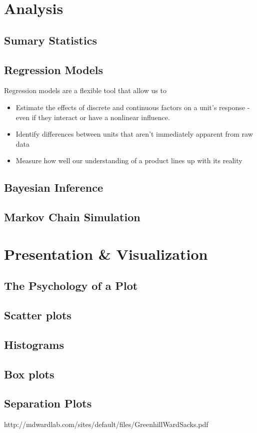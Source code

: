 \documentclass[11pt,a4paper,article]{memoir} %
\begin{document}
\section{Analysis}
\subsection{Sumary Statistics}
\subsection{Regression Models}
Regression models are a flexible tool that allow us to
\begin{itemize}
\item Estimate the effects of discrete and continuous factors on a unit's response - even if they interact or have a nonlinear influence.
\item Identify differences between units that aren't immediately apparent from raw data
\item Measure how well our understanding of a product lines up with its reality
\end{itemize}
\subsection{Bayesian Inference}
\subsection{Markov Chain Simulation}

\section{Presentation \& Visualization}
\subsection{The Psychology of a Plot}
\subsection{Scatter plots}
\subsection{Histograms}
\subsection{Box plots}
\subsection{Separation Plots}
http://mdwardlab.com/sites/default/files/GreenhillWardSacks.pdf
\end{document}
